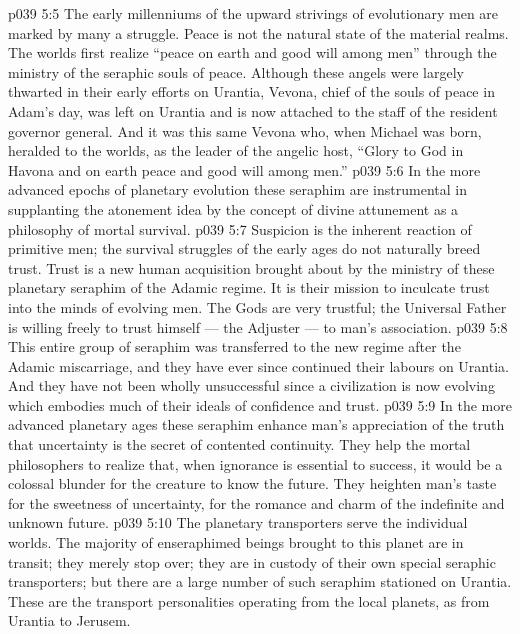 \vs p039 5:5 \bibnobreakspace {} The early millenniums of the upward strivings of evolutionary men are marked by many a struggle. Peace is not the natural state of the material realms. The worlds first realize “peace on earth and good will among men” through the ministry of the seraphic souls of peace. Although these angels were largely thwarted in their early efforts on Urantia, Vevona, chief of the souls of peace in Adam’s day, was left on Urantia and is now attached to the staff of the resident governor general. And it was this same Vevona who, when Michael was born, heralded to the worlds, as the leader of the angelic host, “Glory to God in Havona and on earth peace and good will among men.”
\vs p039 5:6 In the more advanced epochs of planetary evolution these seraphim are instrumental in supplanting the atonement idea by the concept of divine attunement as a philosophy of mortal survival.
\vs p039 5:7 \bibnobreakspace {} Suspicion is the inherent reaction of primitive men; the survival struggles of the early ages do not naturally breed trust. Trust is a new human acquisition brought about by the ministry of these planetary seraphim of the Adamic regime. It is their mission to inculcate trust into the minds of evolving men. The Gods are very trustful; the Universal Father is willing freely to trust himself --- the Adjuster --- to man’s association.
\vs p039 5:8 This entire group of seraphim was transferred to the new regime after the Adamic miscarriage, and they have ever since continued their labours on Urantia. And they have not been wholly unsuccessful since a civilization is now evolving which embodies much of their ideals of confidence and trust.
\vs p039 5:9 In the more advanced planetary ages these seraphim enhance man’s appreciation of the truth that uncertainty is the secret of contented continuity. They help the mortal philosophers to realize that, when ignorance is essential to success, it would be a colossal blunder for the creature to know the future. They heighten man’s taste for the sweetness of uncertainty, for the romance and charm of the indefinite and unknown future.
\vs p039 5:10 \bibnobreakspace {} The planetary transporters serve the individual worlds. The majority of enseraphimed beings brought to this planet are in transit; they merely stop over; they are in custody of their own special seraphic transporters; but there are a large number of such seraphim stationed on Urantia. These are the transport personalities operating from the local planets, as from Urantia to Jerusem.
